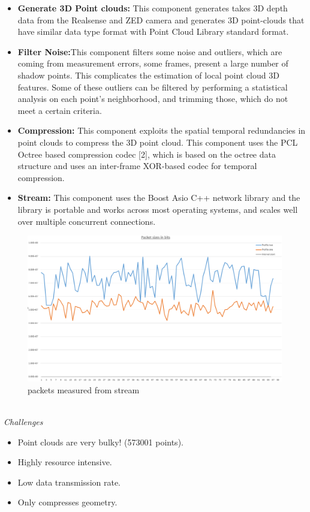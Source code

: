 \begin{itemize}
    \item \textbf{Generate 3D Point clouds:} This component generates takes 3D depth data from the Realsense and ZED camera and generates 3D point-clouds that have similar data type format with Point Cloud Library standard format.
    \item \textbf{Filter Noise:}This component filters some noise and outliers, which are coming from measurement errors, some frames, present a large number of shadow points. This complicates the estimation of local point cloud 3D features. Some of these outliers can be filtered by performing a statistical analysis on each point's neighborhood, and trimming those, which do not meet a certain criteria.
    \item \textbf{Compression:} This component exploits the spatial temporal redundancies in point clouds to compress the 3D point cloud. This component uses the PCL Octree based compression codec [2], which is based on the octree data structure and uses an inter-frame XOR-based codec for temporal compression.
    \item \textbf{Stream:} This component uses the Boost Asio C++ network library and the library is portable and works across most operating systems, and scales well over multiple concurrent connections.
\end{itemize}

\begin{figure}[h]
    \centering
    \includegraphics[scale=0.3]{images/wireshark_general.jpg}
    \caption{packets measured from stream}
    \label{fig:StreamingPipe}
\end{figure}\\

\textit{Challenges}
\begin{itemize}
    \item Point clouds are very bulky! (573001 points).
    \item Highly resource intensive.
    \item Low  data transmission rate.
    \item Only compresses geometry.
\end{itemize}


